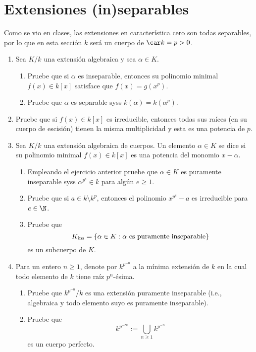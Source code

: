 \documentclass[11pt, reqno]{amsart}
\begin{document}
\section{Extensiones (in)separables}
Como se vio en clases, las extensiones en característica cero son todas separables, por lo que en esta sección $k$ será
un cuerpo de $\car k = p > 0$.
\begin{enumerate}[resume]
	\item Sea $K/k$ una extensión algebraica y sea $\alpha \in K$.
		\begin{enumerate}
			\item Pruebe que si $\alpha$ es inseparable, entonces su polinomio minimal $f(x) \in k[x]$
				satisface que $f(x) = g(x^p)$.
			\item Pruebe que $\alpha$ es separable syss $k(\alpha) = k(\alpha^p)$.
		\end{enumerate}
	\item Pruebe que si $f(x) \in k[x]$ es irreducible, entonces todas sus raíces (en su cuerpo de escisión) tienen
		la misma multiplicidad y esta es una potencia de $p$.
	\item Sea $K/k$ una extensión algebraica de cuerpos.
		Un elemento $\alpha \in K$ se dice  si su polinomio minimal $f(x) \in k[x]$
		es una potencia del monomio $x - \alpha$.
		\begin{enumerate}
			\item\lookright
				Empleando el ejercicio anterior pruebe que $\alpha \in K$ es puramente inseparable syss
				$\alpha^{p^e} \in k$ para algún $e \ge 1$.
			\item Pruebe que si $a \in k \setminus k^p$, entonces el polinomio $x^{p^e} - a$ es irreducible
				para $e \in \N$.
			\item Pruebe que
				\[
					K_{\rm ins} = \{ \alpha \in K : \alpha \text{ es puramente inseparable} \}
				\]
				es un subcuerpo de $K$.
		\end{enumerate}
	\item Para un entero $n \ge 1$, denote por $k^{p^{-n}}$ a la mínima extensión de $k$ en la cual todo elemento de $k$
		tiene raíz $p^n$-ésima.
		\begin{enumerate}
			\item Pruebe que $k^{p^{-n}}/k$ es una extensión puramente inseparable (i.e., algebraica y todo
				elemento suyo es puramente inseparable).
			\item \lookup
				Pruebe que
				\[
					k^{p^{-\infty}} := \bigcup_{n\ge 1} k^{p^{-n}}
				\]
				es un cuerpo perfecto.
		\end{enumerate}
\end{enumerate}
\end{document}

